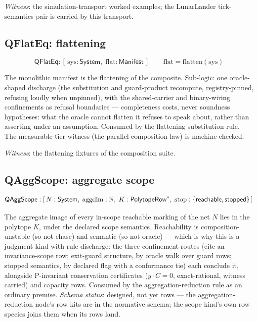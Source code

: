 \emph{Witness}: the simulation-transport worked examples; the
LunarLander tick-semantics pair is carried by this transport.



\subsection{QFlatEq: flattening}
\label{sec:spec-lang-qflateq}

\[
\mathsf{QFlatEq} : [\, \mathrm{sys} : \mathsf{System},\;
  \mathrm{flat} : \mathsf{Manifest} \,]
\qquad
\mathrm{flat} = \mathrm{flatten}(\mathrm{sys})
\]

The monolithic manifest is the flattening of the composite.
Sub-logic: one oracle-shaped discharge (the substitution and
guard-product recompute, registry-pinned, refusing loudly when
unpinned), with the shared-carrier and binary-wiring confinements as
refusal boundaries --- completeness costs, never soundness
hypotheses: what the oracle cannot flatten it refuses to speak about,
rather than asserting under an assumption. Consumed by the
flattening substitution rule. The measurable-tier witness (the
parallel-composition law) is machine-checked.

\emph{Witness}: the flattening fixtures of the composition suite.



\subsection{QAggScope: aggregate scope}
\label{sec:spec-lang-qaggscope}

\[
\mathsf{QAggScope} : [\, N : \mathsf{System},\;
  \mathrm{aggdim} : \mathbb{N},\;
  K : \mathsf{PolytopeRow}^{*},\;
  \mathrm{stop} : \{\mathsf{reachable}, \mathsf{stopped}\} \,]
\]

The aggregate image of every in-scope reachable marking of the net
$N$ lies in the polytope $K$, under the declared scope semantics.
Reachability is composition-unstable (so not chase) and semantic (so
not oracle) --- which is why this is a judgment kind with
rule discharge: the three confinement routes (cite an invariance-scope
row; exit-guard structure, by oracle walk over guard rows; stopped
semantics, by declared flag with a conformance tie) each conclude it,
alongside P-invariant conservation certificates ($y \cdot C = 0$,
exact-rational, witness carried) and capacity rows. Consumed by the
aggregation-reduction rule as an ordinary premise. \emph{Schema
status}: designed, not yet rows --- the aggregation-reduction
node's row kits are in the normative schema; the scope kind's own
row species joins them when its rows land.

